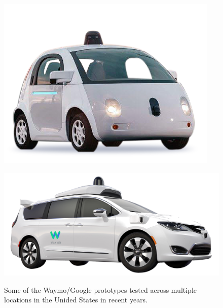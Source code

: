 \begin{figure}[!h]
	\centering
	\begin{minipage}[t]{0.65\textwidth}
		\includegraphics[width=\textwidth]{../figure/veiculos0.png}
		\label{fig:veiculos0}
	\end{minipage}
	\begin{minipage}[t]{0.65\textwidth}
		\includegraphics[width=\textwidth]{../figure/veiculos1.png}
		\label{fig:veiculos1}
	\end{minipage}
	\caption{Some of the Waymo/Google prototypes tested across multiple locations in the Unided States in recent years.}
	\label{fig:waymo}
\end{figure}

